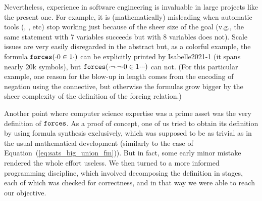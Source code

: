 Nevertheless, experience  in software engineering is invaluable in
large projects like the present one. For example, it is
(mathematically) misleading when automatic tools (,
, etc) stop working just because of the sheer size of the
goal (v.g., the same statement with 7 variables succeeds but with 8
variables does not). Scale issues are very easily disregarded in the
abstract but, as a colorful example, the formula $\mathop{\mathtt{forces}}({\cdot}0\in 1{\cdot})$
can be explicitly printed by Isabelle2021-1 (it spans nearly 20k symbols), but
$\mathop{\mathtt{forces}}({\cdot}\neg{\cdot}\neg{\cdot}0\in 1{\cdot}{\cdot}{\cdot})$
can not.
(For this particular example, one reason for the blow-up in
length comes from the encoding of negation using the 
connective, but otherwise the formulas grow bigger by the sheer
complexity of the definition of the forcing relation.)

Another point where computer science expertise was a prime asset was
the very definition of $\mathop{\mathtt{forces}}$. As a
proof of concept, one of us tried to obtain its definition by
using formula synthesis exclusively, which was supposed to be as
trivial as in the usual
mathematical development (similarly to the case of
Equation~(\ref{eq:sats_big_union_fm})).
But in fact, some early minor mistake
rendered the whole effort useless. We then turned to a more
informed programming discipline, which involved decomposing the
definition in stages, each of which was checked for correctness, and
in that way we were able to reach our objective.


